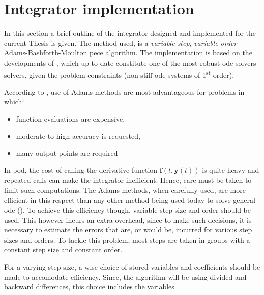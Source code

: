 \section{Integrator implementation}\label{sec:integrator-implementation}

In this section a brief outline of the integrator designed and implemented for 
the current Thesis is given. The method used, is a \emph{variable step}, 
\emph{variable order} Adams-Bashforth-Moulton \gls{pece} algorithm. The 
implementation is based on the developments of \cite{Shampine1975}, which up to 
date constitute one of the most robust \gls{ode} solvers solvers, given the 
problem constraints (non stiff \gls{ode} systems of 1\textsuperscript{st} order).

According to \cite{Shampine1975}, use of Adams methods are most advantageous for 
problems in which:
\begin{itemize}
    \item function evaluations are expensive,
    \item moderate to high accuracy is requested,
    \item many output points are required
\end{itemize}

In \gls{pod}, the cost of calling the derivative function $\bm{f}(t, \bm{y}(t))$ 
is quite heavy and repeated calls can make the integrator inefficient. Hence, care 
must be taken to limit such computations. The Adams methods, when carefully used, 
are more efficient in this respect than any other method being used today to 
solve general \gls{ode} (\cite{Shampine1975}). To achieve this efficiency though, 
variable step size and order should be used. This however incurs an extra overhead, 
since to make such decisions, it is necessary to estimate the errors that are, 
or would be, incurred for various step sizes and orders. To tackle this problem, 
most steps are taken in groups with a constant step size and constant order.

For a varying step size, a wise choice of stored variables and coefficients 
should be made to accomodate efficiency. Since, the algorithm will be using divided 
and backward differences, this choice includes the variables

